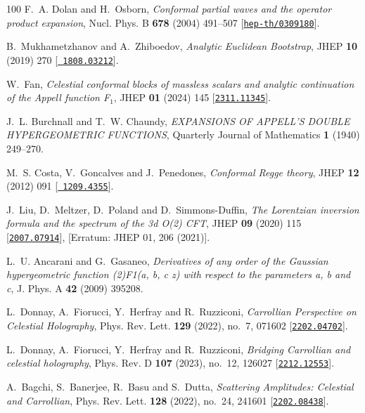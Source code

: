 \begin{thebibliography}{100}
F.~A. Dolan and H.~Osborn,  {\em {Conformal partial waves and the operator
  product expansion}}, Nucl. Phys. B {\bf 678} (2004) 491--507
  [\href{http://www.arXiv.org/abs/hep-th/0309180}{{\tt hep-th/0309180}}].

B.~Mukhametzhanov and A.~Zhiboedov,  {\em {Analytic Euclidean Bootstrap}}, JHEP
  {\bf 10} (2019) 270 [\href{http://www.arXiv.org/abs/1808.03212}{{\tt
  1808.03212}}].

W.~Fan,  {\em {Celestial conformal blocks of massless scalars and analytic
  continuation of the Appell function F$_{1}$}}, JHEP {\bf 01} (2024) 145
  [\href{http://www.arXiv.org/abs/2311.11345}{{\tt 2311.11345}}].

J.~L. Burchnall and T.~W. Chaundy,  {\em EXPANSIONS OF APPELL'S DOUBLE
  HYPERGEOMETRIC FUNCTIONS}, Quarterly Journal of Mathematics {\bf 1} (1940)
  249--270.

M.~S. Costa, V.~Goncalves and J.~Penedones,  {\em {Conformal Regge theory}},
  JHEP {\bf 12} (2012) 091 [\href{http://www.arXiv.org/abs/1209.4355}{{\tt
  1209.4355}}].

J.~Liu, D.~Meltzer, D.~Poland and D.~Simmons-Duffin,  {\em {The Lorentzian
  inversion formula and the spectrum of the 3d O(2) CFT}}, JHEP {\bf 09} (2020)
  115 [\href{http://www.arXiv.org/abs/2007.07914}{{\tt 2007.07914}}], [Erratum:
  JHEP 01, 206 (2021)].

L.~U. Ancarani and G.~Gasaneo,  {\em {Derivatives of any order of the Gaussian
  hypergeometric function (2)F1(a, b, c z) with respect to the parameters a, b
  and c}}, J. Phys. A {\bf 42} (2009) 395208.

L.~Donnay, A.~Fiorucci, Y.~Herfray and R.~Ruzziconi,  {\em {Carrollian
  Perspective on Celestial Holography}}, Phys. Rev. Lett. {\bf 129} (2022),
  no.~7, 071602 [\href{http://www.arXiv.org/abs/2202.04702}{{\tt 2202.04702}}].

L.~Donnay, A.~Fiorucci, Y.~Herfray and R.~Ruzziconi,  {\em {Bridging Carrollian
  and celestial holography}}, Phys. Rev. D {\bf 107} (2023), no.~12, 126027
  [\href{http://www.arXiv.org/abs/2212.12553}{{\tt 2212.12553}}].

A.~Bagchi, S.~Banerjee, R.~Basu and S.~Dutta,  {\em {Scattering Amplitudes:
  Celestial and Carrollian}}, Phys. Rev. Lett. {\bf 128} (2022), no.~24, 241601
  [\href{http://www.arXiv.org/abs/2202.08438}{{\tt 2202.08438}}].


\end{thebibliography}
